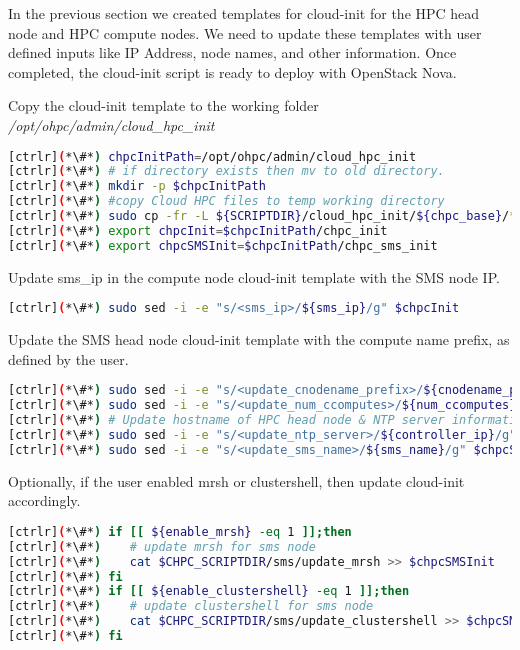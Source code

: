 	In the previous section we created templates for cloud-init for the HPC head node and HPC compute nodes. We need to update these templates with user defined inputs like IP Address, node names, and other information. Once completed, the cloud-init script is ready to deploy with OpenStack Nova.

	Copy the cloud-init template to the working folder {\em /opt/ohpc/admin/cloud\_hpc\_init }


\begin{lstlisting}[language=bash,keywords={}]
[ctrlr](*\#*) chpcInitPath=/opt/ohpc/admin/cloud_hpc_init
[ctrlr](*\#*) # if directory exists then mv to old directory. 
[ctrlr](*\#*) mkdir -p $chpcInitPath
[ctrlr](*\#*) #copy Cloud HPC files to temp working directory
[ctrlr](*\#*) sudo cp -fr -L ${SCRIPTDIR}/cloud_hpc_init/${chpc_base}/* $chpcInitPath
[ctrlr](*\#*) export chpcInit=$chpcInitPath/chpc_init
[ctrlr](*\#*) export chpcSMSInit=$chpcInitPath/chpc_sms_init
\end{lstlisting}

	Update sms\_ip in the compute node cloud-init template with the SMS node IP. 
	
\begin{lstlisting}[language=bash,keywords={}]
[ctrlr](*\#*) sudo sed -i -e "s/<sms_ip>/${sms_ip}/g" $chpcInit
\end{lstlisting}

	Update the SMS head node cloud-init template with the compute name prefix, as defined by the user.

\begin{lstlisting}[language=bash,keywords={}]
[ctrlr](*\#*) sudo sed -i -e "s/<update_cnodename_prefix>/${cnodename_prefix}/g" $chpcSMSInit
[ctrlr](*\#*) sudo sed -i -e "s/<update_num_ccomputes>/${num_ccomputes}/g" $chpcSMSInit
[ctrlr](*\#*) # Update hostname of HPC head node & NTP server information
[ctrlr](*\#*) sudo sed -i -e "s/<update_ntp_server>/${controller_ip}/g" $chpcSMSInit
[ctrlr](*\#*) sudo sed -i -e "s/<update_sms_name>/${sms_name}/g" $chpcSMSInit
\end{lstlisting}

	Optionally, if the user enabled mrsh or clustershell, then update cloud-init accordingly.

\begin{lstlisting}[language=bash,keywords={}]
[ctrlr](*\#*) if [[ ${enable_mrsh} -eq 1 ]];then
[ctrlr](*\#*)    # update mrsh for sms node
[ctrlr](*\#*)    cat $CHPC_SCRIPTDIR/sms/update_mrsh >> $chpcSMSInit
[ctrlr](*\#*) fi
[ctrlr](*\#*) if [[ ${enable_clustershell} -eq 1 ]];then
[ctrlr](*\#*)    # update clustershell for sms node
[ctrlr](*\#*)    cat $CHPC_SCRIPTDIR/sms/update_clustershell >> $chpcSMSInit
[ctrlr](*\#*) fi
\end{lstlisting}
